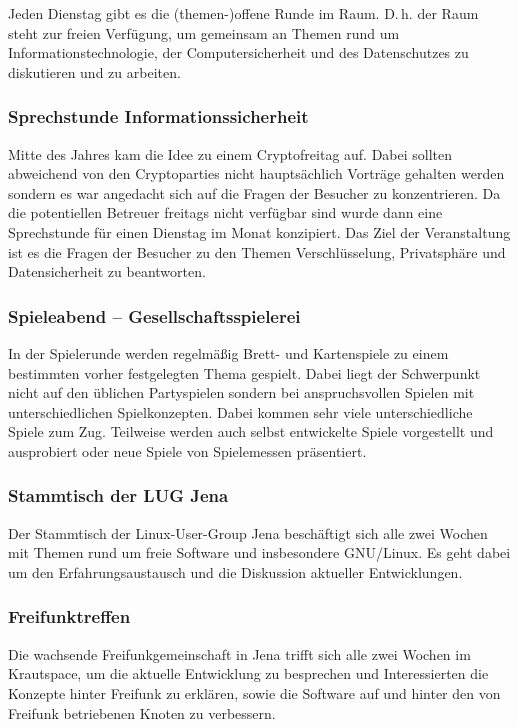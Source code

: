 \documentclass[ngerman,10pt,DIV16]{scrartcl}
\begin{document}
Jeden Dienstag gibt es die (themen-)offene Runde im Raum. D.\,h. der Raum
steht zur freien Verfügung, um gemeinsam an Themen rund um
Informationstechnologie, der Computersicherheit und des
Datenschutzes zu diskutieren und zu arbeiten.

\subsubsection{Sprechstunde Informationssicherheit}

Mitte des Jahres kam die Idee zu einem Cryptofreitag auf. 
Dabei sollten abweichend von den Cryptoparties nicht hauptsächlich Vorträge gehalten werden sondern es war angedacht sich auf die Fragen der Besucher zu konzentrieren. 
Da die potentiellen Betreuer freitags nicht verfügbar sind wurde dann eine Sprechstunde für einen Dienstag im Monat konzipiert. 
Das Ziel der Veranstaltung ist es die Fragen der Besucher zu den Themen Verschlüsselung, Privatsphäre und Datensicherheit zu beantworten. 

\subsubsection{Spieleabend -- Gesellschaftsspielerei}

In der Spielerunde werden regelmäßig Brett- und Kartenspiele zu einem
bestimmten vorher festgelegten Thema gespielt. Dabei liegt der Schwerpunkt
nicht auf den üblichen Partyspielen sondern bei anspruchsvollen Spielen mit
unterschiedlichen Spielkonzepten. Dabei kommen sehr viele unterschiedliche
Spiele zum Zug. Teilweise werden auch selbst entwickelte Spiele vorgestellt
und ausprobiert oder neue Spiele von Spielemessen präsentiert.

\subsubsection{Stammtisch der LUG Jena}

Der Stammtisch der Linux-User-Group Jena beschäftigt sich alle zwei Wochen
mit Themen rund um freie Software und insbesondere GNU/Linux. Es geht dabei
um den Erfahrungsaustausch und die Diskussion aktueller Entwicklungen.

\subsubsection{Freifunktreffen}

Die wachsende Freifunkgemeinschaft in Jena trifft sich alle zwei Wochen
im Krautspace, um die aktuelle Entwicklung zu besprechen und
Interessierten die Konzepte hinter Freifunk zu erklären, sowie die
Software auf und hinter den von Freifunk betriebenen Knoten zu
verbessern.
\end{document}
